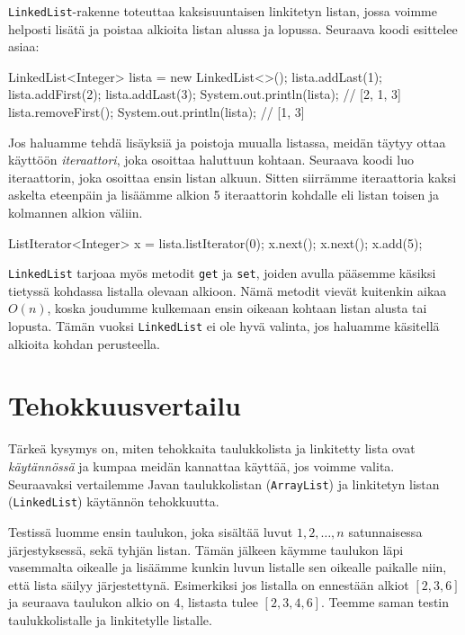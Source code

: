 \texttt{LinkedList}-rakenne toteuttaa kaksisuuntaisen
linkitetyn listan, jossa voimme helposti lisätä ja poistaa
alkioita listan alussa ja lopussa.
Seuraava koodi esittelee asiaa:

\begin{code}
LinkedList<Integer> lista = new LinkedList<>();
lista.addLast(1);
lista.addFirst(2);
lista.addLast(3);
System.out.println(lista); // [2, 1, 3]
lista.removeFirst();
System.out.println(lista); // [1, 3]
\end{code}


Jos haluamme tehdä lisäyksiä ja poistoja muualla listassa,
meidän täytyy ottaa käyttöön \emph{iteraattori}, joka osoittaa haluttuun kohtaan.
Seuraava koodi luo iteraattorin, joka osoittaa ensin listan alkuun.
Sitten siirrämme iteraattoria kaksi askelta eteenpäin ja
lisäämme alkion 5 iteraattorin kohdalle eli listan
toisen ja kolmannen alkion väliin.

\begin{code}
ListIterator<Integer> x = lista.listIterator(0);
x.next();
x.next();
x.add(5);
\end{code}

\texttt{LinkedList} tarjoaa myös metodit
\texttt{get} ja \texttt{set}, joiden avulla
pääsemme käsiksi tietyssä kohdassa listalla olevaan alkioon.
Nämä metodit vievät kuitenkin aikaa $O(n)$,
koska joudumme kulkemaan ensin oikeaan kohtaan listan
alusta tai lopusta.
Tämän vuoksi \texttt{LinkedList} ei ole hyvä valinta,
jos haluamme käsitellä alkioita kohdan perusteella.

\section{Tehokkuusvertailu}

Tärkeä kysymys on, miten tehokkaita taulukkolista ja
linkitetty lista ovat \emph{käytännössä} ja kumpaa meidän
kannattaa käyttää, jos voimme valita.
Seuraavaksi vertailemme Javan taulukkolistan
(\texttt{ArrayList}) ja linkitetyn listan (\texttt{LinkedList})
käytännön tehokkuutta.

Testissä luomme ensin taulukon, joka sisältää luvut $1,2,\dots,n$
satunnaisessa järjestyksessä, sekä tyhjän listan.
Tämän jälkeen käymme taulukon läpi vasemmalta oikealle
ja lisäämme kunkin luvun listalle
sen oikealle paikalle niin, että lista säilyy järjestettynä.
Esimerkiksi jos listalla on ennestään alkiot $[2,3,6]$ ja seuraava
taulukon alkio on $4$, listasta tulee $[2,3,4,6]$.
Teemme saman testin taulukkolistalle ja linkitetylle listalle.

